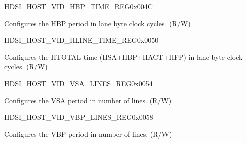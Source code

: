 \begin{register}{H}{DSI\_HOST\_VID\_HBP\_TIME\_REG}{0x004C}\label{regdesc:DSIHOSTVIDHBPTIMEREG}
%
%
\regnewline%
\begin{regdesc}\begin{reglist}
\label{fielddesc:DSIHOSTVIDHBPTIME}\item [DSI\_HOST\_VID\_HBP\_TIME] Configures the HBP period in lane byte clock cycles. (R/W)
\end{reglist}\end{regdesc}
\end{register}


\begin{register}{H}{DSI\_HOST\_VID\_HLINE\_TIME\_REG}{0x0050}\label{regdesc:DSIHOSTVIDHLINETIMEREG}
%
%
\regnewline%
\begin{regdesc}\begin{reglist}
\label{fielddesc:DSIHOSTVIDHLINETIME}\item [DSI\_HOST\_VID\_HLINE\_TIME] Configures the HTOTAL time (HSA+HBP+HACT+HFP) in lane byte clock cycles. (R/W)
\end{reglist}\end{regdesc}
\end{register}


\begin{register}{H}{DSI\_HOST\_VID\_VSA\_LINES\_REG}{0x0054}\label{regdesc:DSIHOSTVIDVSALINESREG}
%
%
\regnewline%
\begin{regdesc}\begin{reglist}
\label{fielddesc:DSIHOSTVSALINES}\item [DSI\_HOST\_VSA\_LINES] Configures the VSA period in number of lines. (R/W)
\end{reglist}\end{regdesc}
\end{register}


\begin{register}{H}{DSI\_HOST\_VID\_VBP\_LINES\_REG}{0x0058}\label{regdesc:DSIHOSTVIDVBPLINESREG}
%
%
\regnewline%
\begin{regdesc}\begin{reglist}
\label{fielddesc:DSIHOSTVBPLINES}\item [DSI\_HOST\_VBP\_LINES] Configures the VBP period in number of lines. (R/W)
\end{reglist}\end{regdesc}
\end{register}


